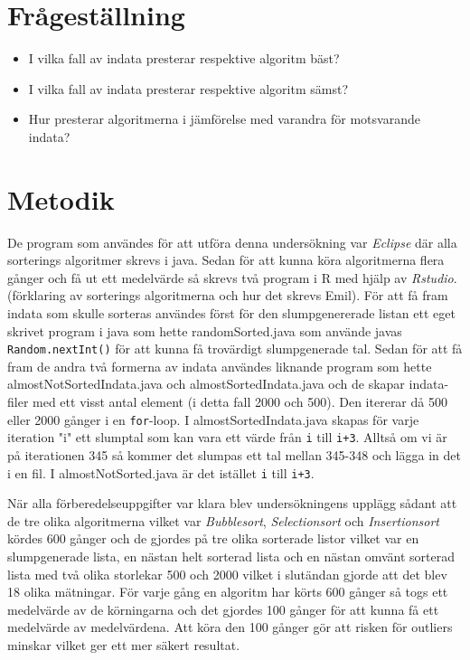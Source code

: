 \documentclass[a4paper]{article}
\begin{document}
\section{Frågeställning}
\begin{itemize}
	\item I vilka fall av indata presterar respektive algoritm bäst?
	\item I vilka fall av indata presterar respektive algoritm sämst?
	\item Hur presterar algoritmerna i jämförelse med varandra för motsvarande indata?
\end{itemize}

\section{Metodik}
De program som användes för att utföra denna undersökning var \emph{Eclipse} där alla sorterings algoritmer skrevs i java. Sedan för att kunna köra algoritmerna flera gånger och få ut ett medelvärde så skrevs två program i R med hjälp av \emph{Rstudio}.  (förklaring av sorterings algoritmerna och hur det skrevs Emil). För att få fram indata som skulle sorteras användes först för den slumpgenererade listan ett eget skrivet program i java som hette randomSorted.java som använde javas \texttt{Random.nextInt()} för att kunna få trovärdigt slumpgenerade tal. Sedan för att få fram de andra två formerna av indata användes liknande program som hette almostNotSortedIndata.java och almostSortedIndata.java och de skapar indata-filer med ett visst antal element (i detta fall 2000 och 500). Den itererar då 500 eller 2000 gånger i en \texttt{for}-loop. I almostSortedIndata.java skapas för varje iteration "i" ett slumptal som kan vara ett värde från \texttt{i} till \texttt{i+3}. Alltså om vi är på iterationen 345 så kommer det slumpas ett tal mellan 345-348 och lägga in det i en fil. I almostNotSorted.java är det istället \texttt{i} till \texttt{i+3}.

När alla förberedelseuppgifter var klara blev undersökningens upplägg sådant att de tre olika algoritmerna vilket var \emph{Bubblesort}, \emph{Selectionsort} och \emph{Insertionsort} kördes 600 gånger och de gjordes på tre olika sorterade listor vilket var en slumpgenerade lista, en nästan helt sorterad lista och en nästan omvänt sorterad lista med två olika storlekar 500 och 2000 vilket i slutändan gjorde att det blev 18 olika mätningar. För varje gång en algoritm har körts 600 gånger så togs ett medelvärde av de körningarna och det gjordes 100 gånger för att kunna få ett medelvärde av medelvärdena. Att köra den 100 gånger gör att risken för outliers minskar vilket ger ett mer säkert resultat.
\end{document}
